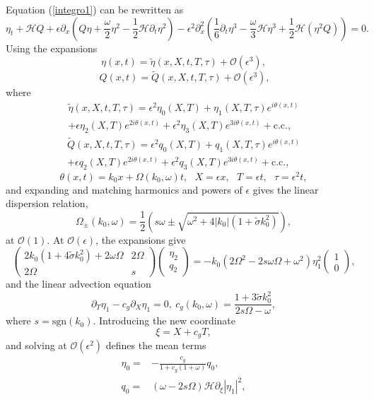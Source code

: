 \documentclass[a4paper,11pt]{article}
\newcommand{\bp}{\begin{pmatrix}}
\newcommand{\ep}{\end{pmatrix}}
\newcommand{\p}{\partial}
\begin{document}
Equation (\ref{integro1}) can be rewritten as
\[
\eta_{t} + \mathcal{H}Q + \epsilon\p_{x}\left(Q\eta + \frac{\omega}{2}\eta^{2}-\frac{1}{2}\mathcal{H}\p_{t}\eta^{2} \right)- \epsilon^{2}\p_{x}^{2}\left(\frac{1}{6}\p_{t}\eta^{3} - \frac{\omega}{3}\mathcal{H}\eta^{3} + \frac{1}{2}\mathcal{H}\left(\eta^{2} Q\right)  \right) = 0.
\]
Using the expansions
\[
\eta(x,t) = \tilde{\eta}(x,X,t,T,\tau) + \mathcal{O}(\epsilon^{3}),\]
\[ ~ Q(x,t) = \tilde{Q}(x,X,t,T,\tau) + \mathcal{O}(\epsilon^{3}),
\]
where 
\begin{multline}
\tilde{\eta}(x,X,t,T,\tau) = \epsilon^{2}\eta_{0}(X,T) + \eta_{1}(X,T,\tau)e^{i\theta(x,t)} \\
+ \epsilon \eta_{2}(X,T)e^{2i\theta(x,t)}  + \epsilon^{2}\eta_{3}(X,T)e^{3i\theta(x,t)} + \mbox{c.c.},
\label{nlssurfexpan}
\end{multline}
\begin{multline}
\tilde{Q}(x,X,t,T,\tau) = \epsilon^{2} q_{0}(X,T) + q_{1}(X,T,\tau)e^{i\theta(x,t)} \\
+ \epsilon q_{2}(X,T)e^{2i\theta(x,t)} + \epsilon^{2}q_{3}(X,T)e^{3i\theta(x,t)} + \mbox{c.c.}, 
\label{nlsvelocexpan} 
\end{multline}
\[
\theta(x,t) = k_{0}x + \Omega(k_{0},\omega)t, ~~~ X = \epsilon x, ~~~ T = \epsilon t, ~~~ \tau = \epsilon^{2}t,
\]
and expanding and matching harmonics and powers of $\epsilon$ gives the linear dispersion relation,
\begin{equation}
\Omega_{\pm}(k_{0},\omega)  = \frac{1}{2}\left(s\omega \pm \sqrt{\omega^{2} + 4|k_{0}|(1+\tilde{\sigma}k_{0}^{2})}\right),
\label{LDR}
\end{equation}
at $\mathcal{O}(1)$.  At $\mathcal{O}(\epsilon)$, the expansions give
\[
\bp 2k_{0}(1+4\tilde{\sigma}k_{0}^{2}) +2\omega\Omega& 2\Omega \\ 2\Omega & s \ep \bp \eta_{2} \\ q_{2} \ep = -k_{0}(2\Omega^{2}-2s\omega\Omega+\omega^{2})\eta_{1}^{2}\bp 1 \\ 0 \ep,
\]
and the linear advection equation
\[
\p_{T}\eta_{1} - c_{g} \p_{X}\eta_{1} = 0, ~ c_{g}(k_{0},\omega) = \frac{1 + 3\tilde{\sigma}k_{0}^{2}}{2s\Omega-\omega},
\]
where $s = \mbox{sgn}(k_{0})$.  Introducing the new coordinate
\[
\xi = X + c_{g}T,
\]
and solving at $\mathcal{O}(\epsilon^2)$ defines the mean terms
\begin{align*}
\eta_{0} = & -\frac{c_{g}}{1+c_{g}(1+\omega)}q_{0},\\
q_{0} = & (\omega - 2 s\Omega)\mathcal{H}\p_{\xi}\left| \eta_{1} \right|^{2},
\end{align*} 
\end{document}
